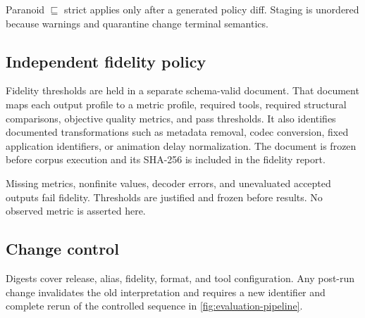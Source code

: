 Paranoid $\sqsubseteq$ strict applies only after a generated policy diff. Staging is
unordered because warnings and quarantine change terminal semantics.

\subsection{Independent fidelity policy}
\label{subsec:fidelity-policy-register}

Fidelity thresholds are held in a separate schema-valid document. That document
maps each output profile to a metric profile, required tools, required structural
comparisons, objective quality metrics, and pass thresholds. It also identifies
documented transformations such as metadata removal, codec conversion, fixed
application identifiers, or animation delay normalization. The document is
frozen before corpus execution and its SHA-256 is included in the fidelity
report.

Missing metrics, nonfinite values, decoder errors, and unevaluated accepted
outputs fail fidelity. Thresholds are justified and frozen before results. No
observed metric is asserted here.

\subsection{Change control}
\label{subsec:policy-change-control}

Digests cover release, alias, fidelity, format, and tool configuration. Any
post-run change invalidates the old interpretation and requires a new identifier
and complete rerun of the controlled sequence in
\cref{fig:evaluation-pipeline}.
